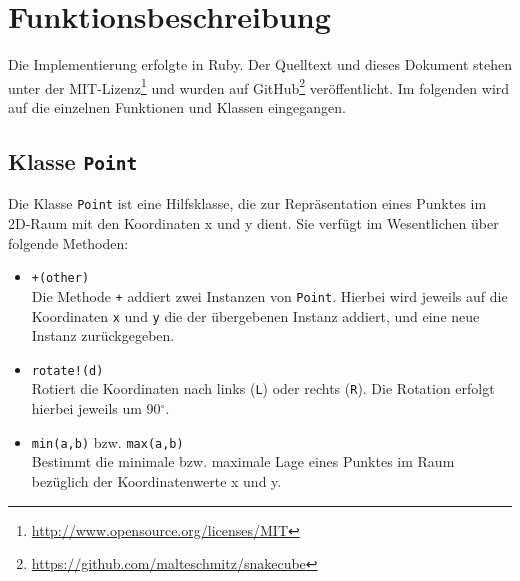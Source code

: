 \documentclass[parskip=half,paper=a4]{scrartcl}
\begin{document}
  \section{Funktionsbeschreibung}
    Die Implementierung erfolgte in Ruby.
    Der Quelltext und dieses Dokument stehen unter der
    MIT-Lizenz\footnote{\url{http://www.opensource.org/licenses/MIT}}
    und wurden auf
    GitHub\footnote{\url{https://github.com/malteschmitz/snakecube}}
    veröffentlicht. Im folgenden wird auf die einzelnen
    Funktionen und Klassen eingegangen.
 
  \subsection{Klasse \lstinline-Point-}
    Die Klasse \lstinline-Point- ist eine Hilfsklasse, die zur Repräsentation eines
    Punktes im 2D-Raum mit den Koordinaten x und y dient.
    Sie verfügt im Wesentlichen über folgende Methoden:
    \begin{itemize}
      \item \lstinline-+(other)-\\
        Die Methode \lstinline-+- addiert zwei Instanzen von \lstinline-Point-. Hierbei
        wird jeweils auf die Koordinaten \lstinline-x- und \lstinline-y- die der
        übergebenen Instanz addiert, und eine neue Instanz zurückgegeben.
      \item \lstinline-rotate!(d)-\\
        Rotiert die Koordinaten nach links (\texttt{L}) oder rechts (\texttt{R}).
        Die Rotation erfolgt hierbei jeweils um 90$^\circ$.
      \item \lstinline-min(a,b)- bzw. \lstinline-max(a,b)-\\
        Bestimmt die minimale bzw. maximale Lage eines Punktes im Raum bezüglich
        der Koordinatenwerte x und y.
    \end{itemize}
    
\end{document}
